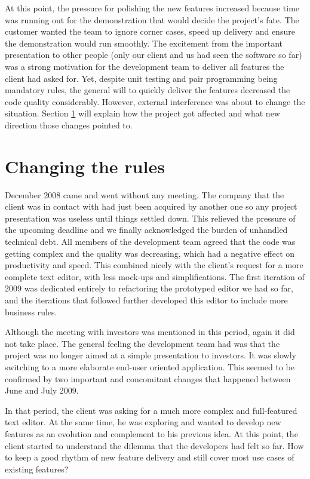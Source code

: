 \documentclass[lnbip]{svmultln}
\begin{document}
At this point, the pressure for polishing the new features increased
because time was running out for the demonstration that would decide
the project's fate. The customer wanted the team to ignore corner
cases, speed up delivery and ensure the demonstration would run
smoothly. The excitement from the important presentation to other
people (only our client and us had seen the software so far) was a
strong motivation for the development team to deliver all features the
client had asked for. Yet, despite unit testing and pair programming
being mandatory rules, the general will to quickly deliver the
features decreased the code quality considerably. However, external
interference was about to change the situation. Section
\ref{sec:changes} will explain how the project got affected and what
new direction those changes pointed to.

\section{Changing the rules}
\label{sec:changes}

December 2008 came and went without any meeting. The company that the
client was in contact with had just been acquired by another one so
any project presentation was useless until things settled down. This
relieved the pressure of the upcoming deadline and we finally
acknowledged the burden of unhandled technical debt. All members of
the development team agreed that the code was getting complex and the
quality was decreasing, which had a negative effect on productivity
and speed. This combined nicely with the client's request for a more
complete text editor, with less mock-ups and simplifications. The
first iteration of 2009 was dedicated entirely to refactoring the
prototyped editor we had so far, and the iterations that followed
further developed this editor to include more business rules.

Although the meeting with investors was mentioned in this period,
again it did not take place. The general feeling the development team
had was that the project was no longer aimed at a simple presentation
to investors. It was slowly switching to a more elaborate end-user
oriented application. This seemed to be confirmed by two important and
concomitant changes that happened between June and July 2009.

In that period, the client was asking for a much more complex and
full-featured text editor. At the same time, he was exploring and
wanted to develop new features as an evolution and complement to his
previous idea. At this point, the client started to understand the
dilemma that the developers had felt so far.  How to keep a good
rhythm of new feature delivery and still cover most use cases of
existing features?
\end{document}

